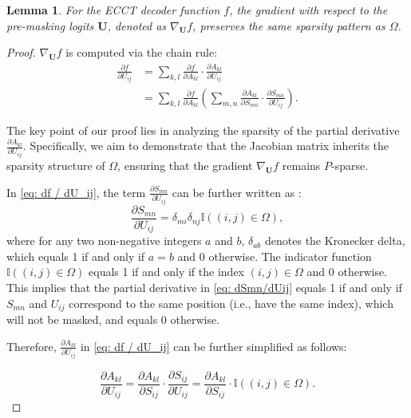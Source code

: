\documentclass[lettersize,onecolumn]{IEEEtran}
\newtheorem{lemma}{Lemma}
\begin{document}
\begin{lemma}\label{lemma: the sparsity of gradient df/dU}
    For the ECCT decoder function $f$, the gradient with respect to the pre-masking logits $\mathbf{U}$, denoted as $\nabla_{\mathbf{U}}f$, preserves the same sparsity pattern as $\Omega$.
\end{lemma}

\begin{proof}
$\nabla_{\mathbf{U}}f$ is computed via the chain rule:
\begin{equation}
    \begin{aligned}
    \frac{\partial f}{\partial U_{i j}}&=\sum_{k, l} \frac{\partial f}{\partial A_{k l}} \cdot \frac{\partial A_{k l}}{\partial U_{i j}}\\
    &=\sum_{k, l} \frac{\partial f}{\partial A_{k l}}\left(\sum_{m, n} \frac{\partial A_{k l}}{\partial S_{m n}} \cdot \frac{\partial S_{m n}}{\partial U_{i j}}\right).
    \end{aligned}
    \label{eq: df / dU_ij}
\end{equation}

The key point of our proof lies in analyzing the sparsity of the partial derivative $\frac{\partial A_{k l}}{\partial U_{i j}}$. Specifically, we aim to demonstrate that the Jacobian matrix inherits the sparsity structure of $\Omega$, ensuring that the gradient $\nabla_{\mathbf{U}}f$ remains $P$-sparse.

In \eqref{eq: df / dU_ij}, the term $\frac{\partial S_{m n}}{\partial U_{i j}}$ can be further written as :
\begin{equation}
    \frac{\partial S_{m n}}{\partial U_{i j}} = \delta_{mi} \delta_{nj}\mathbb{I}\left((i,j)\in \Omega \right),
    \label{eq: dSmn/dUij}
\end{equation}
where for any two non-negative integers $a$ and $b$, $\delta_{ab}$ denotes the Kronecker delta, which equals 1 if and only if $a=b$ and 0 otherwise. The indicator function $\mathbb{I}\left((i,j)\in \Omega \right)$ equals 1 if and only if the index $(i,j) \in \Omega$ and 0 otherwise. This implies that the partial derivative in \eqref{eq: dSmn/dUij} equals 1 if and only if $S_{m n}$ and $U_{i j}$ correspond to the same position (i.e., have the same index), which will not be masked, and equals 0 otherwise.

Therefore, $\frac{\partial A_{k l}}{\partial U_{i j}}$ in \eqref{eq: df / dU_ij} can be further simplified as follows:

\begin{equation}
    \frac{\partial A_{k l}}{\partial U_{i j}}=\frac{\partial A_{k l}}{\partial S_{i j}} \cdot \frac{\partial S_{i j}}{\partial U_{i j}}=\frac{\partial A_{k l}}{\partial S_{i j}} \cdot \mathbb{I}((i, j) \in \Omega).
\end{equation}


\end{proof}
\end{document}

